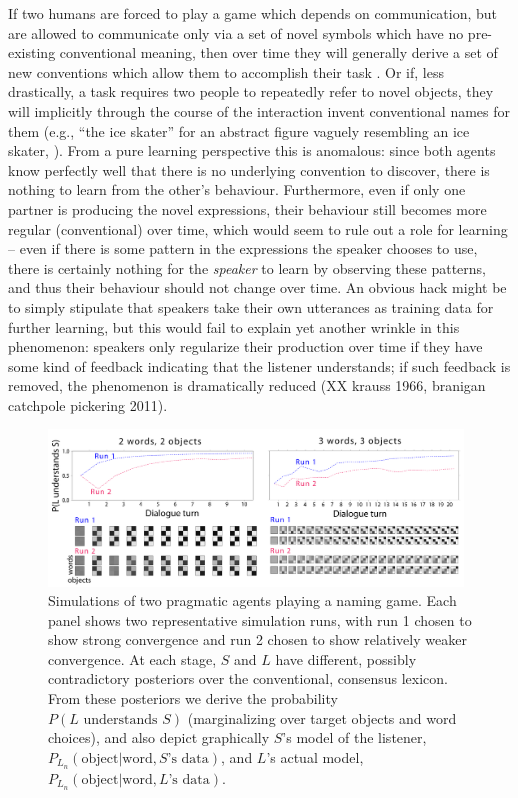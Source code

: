 \documentclass{article} %
\newcommand{\word}{\text{word}}
\newcommand{\obj}{\text{object}}
\begin{document}
If two humans are forced to play a game which depends on communication, but are allowed to communicate only via a set of novel symbols which have no pre-existing conventional meaning, then over time they will generally derive a set of new conventions which allow them to accomplish their task \cite{galantucci2005}. Or if, less drastically, a task requires two people to repeatedly refer to novel objects, they will implicitly through the course of the interaction invent conventional names for them (e.g., ``the ice skater'' for an abstract figure vaguely resembling an ice skater, \cite{clark1986}). From a pure learning perspective this is anomalous: since both agents know perfectly well that there is no underlying convention to discover, there is nothing to learn from the other's behaviour. Furthermore, even if only one partner is producing the novel expressions, their behaviour still becomes more regular (conventional) over time, which would seem to rule out a role for learning -- even if there is some pattern in the expressions the speaker chooses to use, there is certainly nothing for the \textit{speaker} to learn by observing these patterns, and thus their behaviour should not change over time. An obvious hack might be to simply stipulate that speakers take their own utterances as training data for further learning, but this would fail to explain yet another wrinkle in this phenomenon: speakers only regularize their production over time if they have some kind of feedback indicating that the listener understands; if such feedback is removed, the phenomenon is dramatically reduced (XX krauss 1966, branigan catchpole pickering 2011).

\begin{figure}[t]
\centering
\includegraphics[width=0.98\textwidth]{figures/emergence-composite.pdf}
\caption{\label{fig:emergence} Simulations of two pragmatic agents playing a naming game. Each panel shows two representative simulation runs, with run 1 chosen to show strong convergence and run 2 chosen to show relatively weaker convergence. At each stage, $S$ and $L$ have different, possibly contradictory posteriors over the conventional, consensus lexicon. From these posteriors we derive the probability $P(\text{$L$ understands $S$})$ (marginalizing over target objects and word choices), and also depict graphically $S$'s model of the listener, $P_{L_n}(\obj | \word, \text{$S$'s data})$, and $L$'s actual model, $P_{L_n}(\obj | \word, \text{$L$'s data})$. }
\end{figure}
\end{document}
